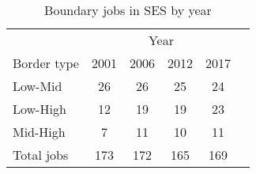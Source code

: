 \begin{table}
	\caption{Boundary jobs in SES by year}
	\label{tab:sesBorderJobs}
	\centering
	\begin{tabular}{lccccc}
	
\toprule
& \multicolumn{4}{c}{Year}\\
Border type & 2001 & 2006 & 2012 & 2017  \\
\midrule
Low-Mid&26&26&25&24 \\
Low-High&12&19&19&23 \\
Mid-High&7&11&10&11 \\
\midrule
Total jobs&173&172&165&169 \\
\bottomrule
\end{tabular}
\end{table}
